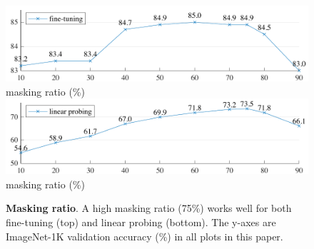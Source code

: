 \documentclass[10pt,twocolumn,letterpaper]{article}
\begin{document}
\begin{figure}[t]\centering
\vspace{-1em}
\includegraphics[width=.9\linewidth]{fig/ratio_ft}\\
\scriptsize masking ratio (\%) \\
\includegraphics[width=.9\linewidth]{fig/ratio_linear}\\
\scriptsize masking ratio (\%) \\
\vspace{-.7em}
\caption{\textbf{Masking ratio}. A high masking ratio (75\%) works well for both fine-tuning (top) and linear probing (bottom). The y-axes are ImageNet-1K validation accuracy (\%) in all plots in this paper.
}
\label{fig:mask_ratio}
\vspace{-1em}
\end{figure}
\end{document}
